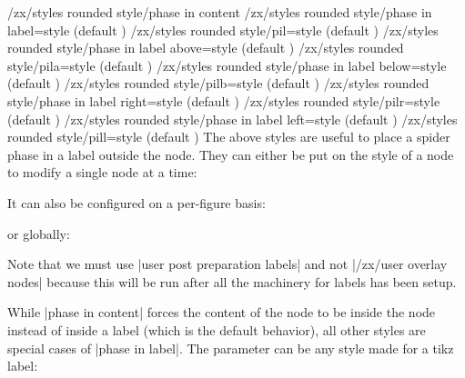 \documentclass[a4paper]{ltxdoc}
\begin{document}
\begin{pgfmanualentry}
  \makeatletter
  \def\extrakeytext{style, }
  \extractkey/zx/styles rounded style/phase in content\@nil%
  \extractkey/zx/styles rounded style/phase in label=style (default {})\@nil%
  \extractkey/zx/styles rounded style/pil=style (default {})\@nil%
  \extractkey/zx/styles rounded style/phase in label above=style (default {})\@nil%
  \extractkey/zx/styles rounded style/pila=style (default {})\@nil%
  \extractkey/zx/styles rounded style/phase in label below=style (default {})\@nil%
  \extractkey/zx/styles rounded style/pilb=style (default {})\@nil%
  \extractkey/zx/styles rounded style/phase in label right=style (default {})\@nil%
  \extractkey/zx/styles rounded style/pilr=style (default {})\@nil%
  \extractkey/zx/styles rounded style/phase in label left=style (default {})\@nil%
  \extractkey/zx/styles rounded style/pill=style (default {})\@nil%
  \makeatother
  \pgfmanualbody
  The above styles are useful to place a spider phase in a label outside the node. They can either be put on the style of a node to modify a single node at a time:
\begin{codeexample}[]
\end{codeexample}
\noindent It can also be configured on a per-figure basis:
\begin{codeexample}[]
\end{codeexample}
\noindent or globally:
\begin{codeexample}[]
{
}
\end{codeexample}
Note that we must use |user post preparation labels| and not |/zx/user overlay nodes| because this will be run after all the machinery for labels has been setup.

  While |phase in content| forces the content of the node to be inside the node instead of inside a label (which is the default behavior), all other styles are special cases of |phase in label|. The  parameter can be any style made for a tikz label:
\begin{codeexample}[width=3cm]
  \zx{
    \zxX[phase in label={label position=45, text=purple}]{\alpha}
  }
\end{codeexample}


\end{pgfmanualentry}
\end{document}
